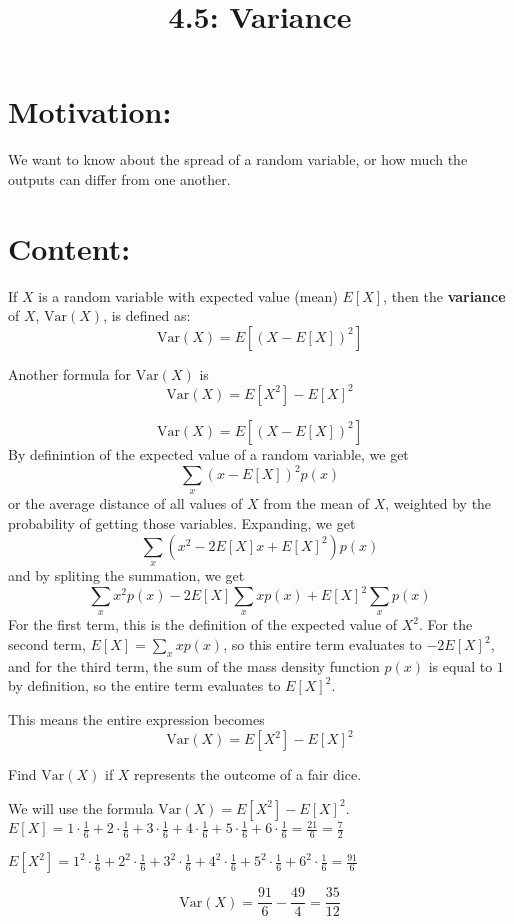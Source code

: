 \documentclass{article}
\title{4.5: Variance}
\begin{document}
\maketitle
\section{Motivation:}
We want to know about the spread of a random variable, or how much the outputs can differ from one another.

\section{Content:}

\begin{definition}[Variance]
If $X$ is a random variable with expected value (mean) $E[X]$, then the \textbf{variance} of $X$, $\text{Var}(X)$, is defined as: $$\text{Var}(X) = E[(X-E[X])^2]$$ 
\end{definition}

\begin{proposition}
Another formula for $\text{Var}(X)$ is $$\text{Var}(X) = E[X^2]-E[X]^2$$
\end{proposition}

\begin{customproof}
$$\text{Var}(X) = E[(X-E[X])^2]$$By definintion of the expected value of a random variable, we get $$\sum_{x}(x-E[X])^2p(x)$$or the average distance of all values of $X$ from the mean of $X$, weighted by the probability of getting those variables. Expanding, we get $$\sum_{x}(x^2-2E[X]x+E[X]^2)p(x)$$and by spliting the summation, we get$$\sum_x x^2p(x) - 2E[X]\sum_x xp(x) + E[X]^2\sum_xp(x)$$For the first term, this is the definition of the expected value of $X^2$. For the second term, $E[X] = \sum_{x} xp(x)$, so this entire term evaluates to $-2E[X]^2$, and for the third term, the sum of the mass density function $p(x)$ is equal to $1$ by definition, so the entire term evaluates to $E[X]^2$.

This means the entire expression becomes $$\text{Var}(X) = E[X^2] - E[X]^2$$
\end{customproof}

\begin{example}
Find $\text{Var}(X)$ if $X$ represents the outcome of a fair dice.
\end{example}

\begin{solution}
We will use the formula $\text{Var}(X) = E[X^2]-E[X]^2$. $E[X] = 1\cdot\frac{1}{6} + 2\cdot\frac{1}{6} + 3\cdot\frac{1}{6} + 4\cdot\frac{1}{6} + 5\cdot\frac{1}{6} + 6\cdot\frac{1}{6} = \frac{21}{6} = \frac{7}{2}$

$E[X^2] = 1^2\cdot \frac{1}{6} + 2^2\cdot \frac{1}{6} + 3^2\cdot \frac{1}{6} + 4^2\cdot \frac{1}{6} + 5^2\cdot \frac{1}{6} + 6^2\cdot \frac{1}{6} = \frac{91}{6}$

$$\text{Var}(X) = \frac{91}{6} - \frac{49}{4} = \frac{35}{12}$$
\end{solution}
\end{document}
